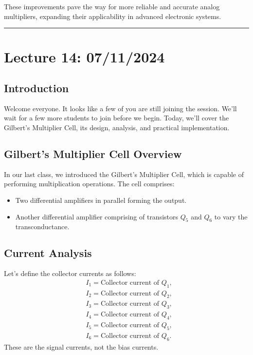 \documentclass[a4paper,9pt,twoside,openany,twocolumn]{memoir}
\begin{document}
These improvements pave the way for more reliable and accurate analog multipliers, expanding their applicability in advanced electronic systems.\
\begin{center}\rule{0.5\linewidth}{0.5pt}\end{center}

\section*{Lecture 14: 07/11/2024}

\subsection{Introduction}
Welcome everyone. It looks like a few of you are still joining the session. We'll wait for a few more students to join before we begin. Today, we'll cover the Gilbert's Multiplier Cell, its design, analysis, and practical implementation.

\subsection{Gilbert's Multiplier Cell Overview}
In our last class, we introduced the Gilbert's Multiplier Cell, which is capable of performing multiplication operations. The cell comprises:
\begin{itemize}
    \item Two differential amplifiers in parallel forming the output.
    \item Another differential amplifier comprising of transistors $Q_5$ and $Q_6$ to vary the transconductance.
\end{itemize}

\subsection{Current Analysis}
Let’s define the collector currents as follows:
\begin{align*}
    &I_1 = \text{Collector current of } Q_1, \\
    &I_2 = \text{Collector current of } Q_2, \\
    &I_3 = \text{Collector current of } Q_3, \\
    &I_4 = \text{Collector current of } Q_4, \\
    &I_5 = \text{Collector current of } Q_5, \\
    &I_6 = \text{Collector current of } Q_6.
\end{align*}
These are the signal currents, not the bias currents.
\end{document}
